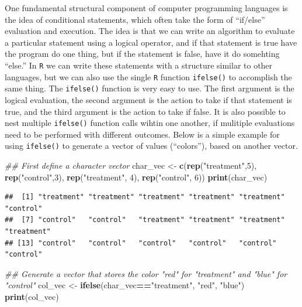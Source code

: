 \documentclass[]{book}
\newenvironment{Shaded}{\begin{snugshade}}{\end{snugshade}}
\newcommand{\CommentTok}[1]{\textcolor[rgb]{0.56,0.35,0.01}{\textit{#1}}}
\newcommand{\DecValTok}[1]{\textcolor[rgb]{0.00,0.00,0.81}{#1}}
\newcommand{\KeywordTok}[1]{\textcolor[rgb]{0.13,0.29,0.53}{\textbf{#1}}}
\newcommand{\NormalTok}[1]{#1}
\newcommand{\OperatorTok}[1]{\textcolor[rgb]{0.81,0.36,0.00}{\textbf{#1}}}
\newcommand{\StringTok}[1]{\textcolor[rgb]{0.31,0.60,0.02}{#1}}
\begin{document}
One fundamental structural component of computer programming languages is the idea of conditional statements, which often take the form of ``if/else'' evaluation and execution. The idea is that we can write an algorithm to evaluate a particular statement using a logical operator, and if that statement is true have the program do one thing, but if the statement is false, have it do somehting ``else.'' In \texttt{R} we can write these statements with a structure similar to other languages, but we can also use the single \texttt{R} function \texttt{ifelse()} to accomplish the same thing. The \texttt{ifelse()} function is very easy to use. The first argument is the logical evaluation, the second argument is the action to take if that statement is true, and the third argument is the action to take if false. It is also possible to nest multiple \texttt{ifelse()} function calls wihtin one another, if mulitiple evaluations need to be performed with different outcomes. Below is a simple example for using \texttt{ifelse()} to generate a vector of values (``colors''), based on another vector.

\begin{Shaded}
\begin{Highlighting}[]
\CommentTok{## First define a character vector}
\NormalTok{char_vec <-}\StringTok{ }\KeywordTok{c}\NormalTok{(}\KeywordTok{rep}\NormalTok{(}\StringTok{"treatment"}\NormalTok{,}\DecValTok{5}\NormalTok{), }\KeywordTok{rep}\NormalTok{(}\StringTok{"control"}\NormalTok{,}\DecValTok{3}\NormalTok{), }\KeywordTok{rep}\NormalTok{(}\StringTok{"treatment"}\NormalTok{, }\DecValTok{4}\NormalTok{), }\KeywordTok{rep}\NormalTok{(}\StringTok{"control"}\NormalTok{, }\DecValTok{6}\NormalTok{))}
\KeywordTok{print}\NormalTok{(char_vec)}
\end{Highlighting}
\end{Shaded}

\begin{verbatim}
##  [1] "treatment" "treatment" "treatment" "treatment" "treatment" "control"  
##  [7] "control"   "control"   "treatment" "treatment" "treatment" "treatment"
## [13] "control"   "control"   "control"   "control"   "control"   "control"
\end{verbatim}

\begin{Shaded}
\begin{Highlighting}[]
\CommentTok{## Generate a vector that stores the color "red" for "treatment" and "blue" for "control"}
\NormalTok{col_vec <-}\StringTok{ }\KeywordTok{ifelse}\NormalTok{(char_vec}\OperatorTok{==}\StringTok{"treatment"}\NormalTok{, }\StringTok{"red"}\NormalTok{, }\StringTok{"blue"}\NormalTok{)}
\KeywordTok{print}\NormalTok{(col_vec)}
\end{Highlighting}
\end{Shaded}
\end{document}

